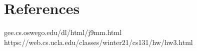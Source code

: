 


\section* {References}
gee.cs.oswego.edu/dl/html/j9mm.html
\\ 
https://web.cs.ucla.edu/classes/winter21/cs131/hw/hw3.html


